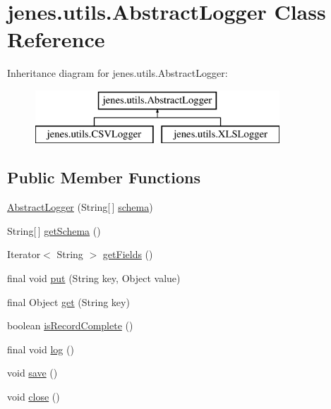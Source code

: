 \hypertarget{classjenes_1_1utils_1_1_abstract_logger}{\section{jenes.\-utils.\-Abstract\-Logger Class Reference}
\label{classjenes_1_1utils_1_1_abstract_logger}
}
Inheritance diagram for jenes.\-utils.\-Abstract\-Logger\-:\begin{figure}[H]
\begin{center}
\leavevmode
\includegraphics[height=2.000000cm]{classjenes_1_1utils_1_1_abstract_logger}
\end{center}
\end{figure}
\subsection*{Public Member Functions}
\begin{DoxyCompactItemize}
\item 
\hyperlink{classjenes_1_1utils_1_1_abstract_logger_a357a64e024ede4da833b79455ba63644}{Abstract\-Logger} (String\mbox{[}$\,$\mbox{]} \hyperlink{classjenes_1_1utils_1_1_abstract_logger_a3a2030876857a0512fae7e0ad400c570}{schema})
\item 
String\mbox{[}$\,$\mbox{]} \hyperlink{classjenes_1_1utils_1_1_abstract_logger_a3f4dc79a211f8e01c621d42dec8d4de2}{get\-Schema} ()
\item 
Iterator$<$ String $>$ \hyperlink{classjenes_1_1utils_1_1_abstract_logger_ae939c8578c5342d8f11ff61388ddfd80}{get\-Fields} ()
\item 
final void \hyperlink{classjenes_1_1utils_1_1_abstract_logger_a0f00b8fa60e88b7c2834be7cdf1fc07e}{put} (String key, Object value)
\item 
final Object \hyperlink{classjenes_1_1utils_1_1_abstract_logger_acceb0a183912b0ec7fc95554ab2e3001}{get} (String key)
\item 
boolean \hyperlink{classjenes_1_1utils_1_1_abstract_logger_af4f01e740a9332b8bb32817e01e7b030}{is\-Record\-Complete} ()
\item 
final void \hyperlink{classjenes_1_1utils_1_1_abstract_logger_a26e56f4617fbd249359186c90ec265ba}{log} ()
\item 
void \hyperlink{classjenes_1_1utils_1_1_abstract_logger_a736fbff3759196a70dbf6618f10e8786}{save} ()
\item 
void \hyperlink{classjenes_1_1utils_1_1_abstract_logger_a7d973cbb6b91f254a5430a8875898dbe}{close} ()
\end{DoxyCompactItemize}
